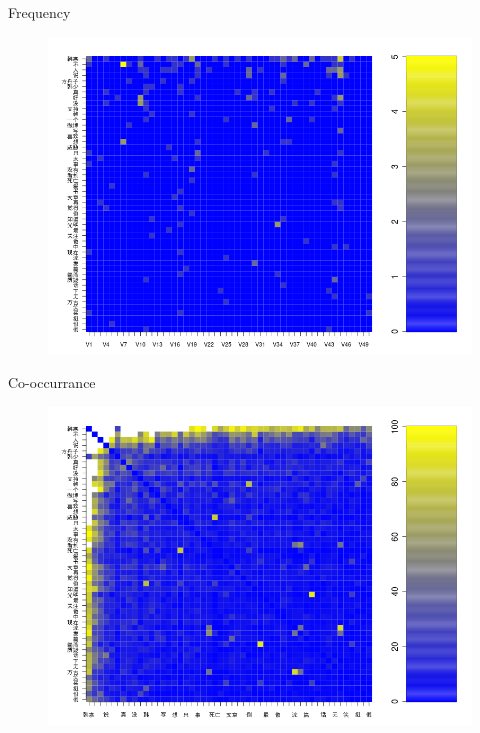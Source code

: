 \documentclass[12pt, trans]{beamer}
\newcommand{\1}[1]{{\mathbf 1}\left\{#1\right\}}        %
\begin{document}
\begin{frame}{Frequency}

\begin{figure}
  \centering
  \includegraphics[height=0.9\textheight]{./../../wordFreqMat.png} 
\end{figure}


\end{frame}

\begin{frame}{Co-occurrance}

\begin{figure}
  \centering
  \includegraphics[height=0.9\textheight]{./../../coocurResults/cooccurMatPlot.png} 
\end{figure}


\end{frame}
\end{document}
